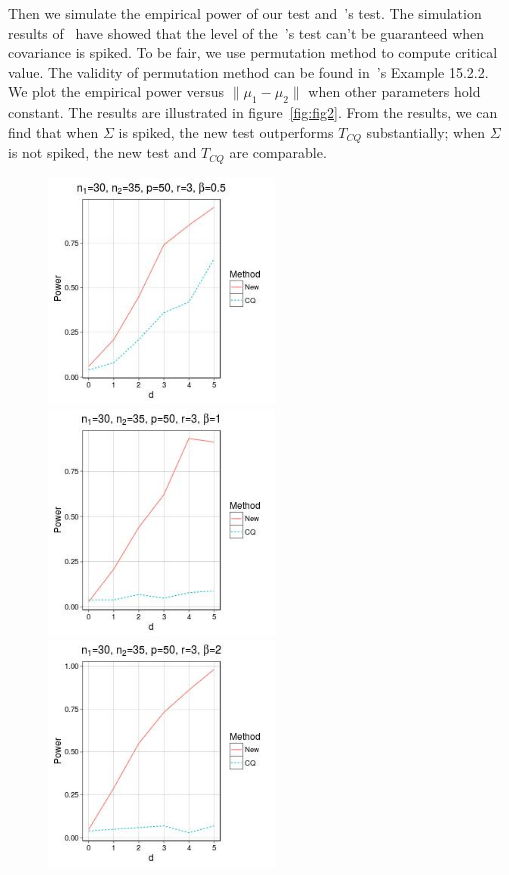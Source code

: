 \documentclass[review]{elsarticle}
\theoremstyle{plain}
\theoremstyle{definition}
\theoremstyle{remark}
\begin{document}




Then we simulate the empirical power of our test and~\cite{Chen2010A}'s test. The simulation results of~\cite{Ma2015A} have showed that the level of the~\cite{Chen2010A}'s test can't be guaranteed when covariance is spiked. To be fair, we use permutation method to compute critical value. The validity of permutation method can be found in~\cite{Lehmann}'s Example 15.2.2. We plot the empirical power versus $\|\mu_1-\mu_2\|$ when other parameters hold constant. The results are illustrated in figure~\ref{fig:fig2}.
From the results, we can find that when $\Sigma$ is spiked, the new test outperforms $T_{CQ}$ substantially; when $\Sigma$ is not spiked, the new test and $T_{CQ}$ are comparable.
\begin{figure}
    \centering 
    \includegraphics[height=6cm]{code/fig1.jpeg}
    \includegraphics[height=6cm]{code/fig2.jpeg}
    \\
    \includegraphics[height=6cm]{code/fig3.jpeg}

\end{figure}
\end{document}

